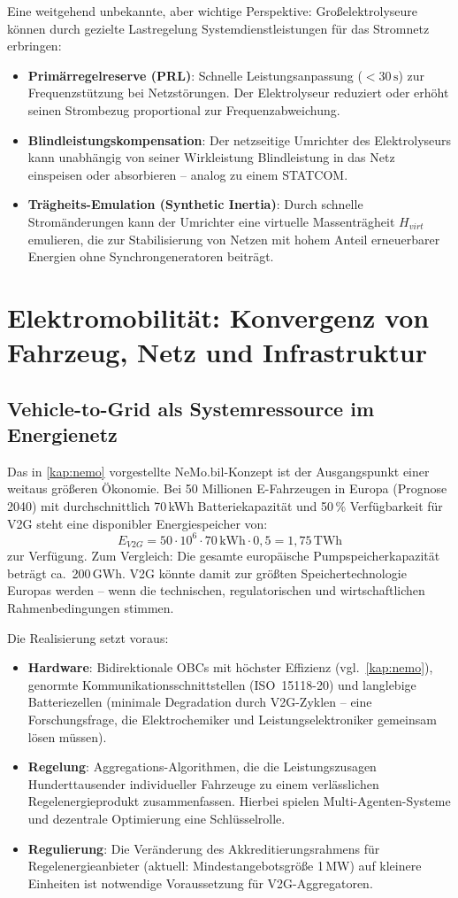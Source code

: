 ﻿\documentclass[a4paper,12pt,openany,oneside]{book}
\newcommand{\abschnitt}[1]{\section{#1}}
\newcommand{\unterabschnitt}[1]{\subsection{#1}}
\theoremstyle{definition}
\begin{document}
Eine weitgehend unbekannte, aber wichtige Perspektive: Gro\ss{}elektrolyseure k\"onnen
durch gezielte Lastregelung Systemdienstleistungen f\"ur das Stromnetz erbringen:
\begin{itemize}
  \item \textbf{Prim\"arregelreserve (PRL)}: Schnelle Leistungsanpassung ($< 30\,\mathrm{s}$)
    zur Frequenzst\"utzung bei Netzst\"orungen. Der Elektrolyseur reduziert oder erh\"oht
    seinen Strombezug proportional zur Frequenzabweichung.
  \item \textbf{Blindleistungskompensation}: Der netzseitige Umrichter des Elektrolyseurs
    kann unabh\"angig von seiner Wirkleistung Blindleistung in das Netz einspeisen oder
    absorbieren -- analog zu einem STATCOM.
  \item \textbf{Trägheits-Emulation (Synthetic Inertia)}: Durch schnelle Strom\"anderungen
    kann der Umrichter eine virtuelle Massentr\"agheit $H_{virt}$ emulieren, die zur
    Stabilisierung von Netzen mit hohem Anteil erneuerbarer Energien ohne Synchrongeneratoren
    beitr\"agt.
\end{itemize}

\abschnitt{Elektromobilit\"at: Konvergenz von Fahrzeug, Netz und Infrastruktur}

\unterabschnitt{Vehicle-to-Grid als Systemressource im Energienetz}

Das in \autoref{kap:nemo} vorgestellte NeMo.bil-Konzept ist der Ausgangspunkt einer
weitaus gr\"o\ss{}eren \"Okonomie. Bei 50 Millionen E-Fahrzeugen in Europa (Prognose 2040)
mit durchschnittlich 70\,kWh Batteriekapazit\"at und 50\,\% Verf\"ugbarkeit f\"ur V2G
steht eine disponibler Energiespeicher von:
\[
  E_{V2G} = 50 \cdot 10^6 \cdot 70\,\mathrm{kWh} \cdot 0{,}5 = 1{,}75\,\mathrm{TWh}
\]
zur Verf\"ugung. Zum Vergleich: Die gesamte europ\"aische Pumpspeicherkapazit\"at betr\"agt
ca.\ 200\,GWh. V2G k\"onnte damit zur gr\"o\ss{}ten Speichertechnologie Europas werden --
wenn die technischen, regulatorischen und wirtschaftlichen Rahmenbedingungen stimmen.

Die Realisierung setzt voraus:
\begin{itemize}
  \item \textbf{Hardware}: Bidirektionale OBCs mit h\"ochster Effizienz (vgl.\ \autoref{kap:nemo}),
    genormte Kommunikationsschnittstellen (ISO~15118-20) und langlebige Batteriezellen
    (minimale Degradation durch V2G-Zyklen -- eine Forschungsfrage, die Elektrochemiker und
    Leistungselektroniker gemeinsam l\"osen m\"ussen).
  \item \textbf{Regelung}: Aggregations-Algorithmen, die die Leistungszusagen Hunderttausender
    individueller Fahrzeuge zu einem verl\"asslichen Regelenergieprodukt zusammenfassen.
    Hierbei spielen Multi-Agenten-Systeme und dezentrale Optimierung eine Schl\"usselrolle.
  \item \textbf{Regulierung}: Die Ver\"anderung des Akkreditierungsrahmens f\"ur
    Regelenergieanbieter (aktuell: Mindestangebotsgr\"o\ss{}e 1\,MW) auf kleinere
    Einheiten ist notwendige Voraussetzung f\"ur V2G-Aggregatoren.
\end{itemize}
\end{document}
